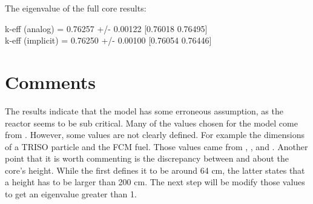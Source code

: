 \documentclass[11pt,letterpaper]{article}
\begin{document}
The eigenvalue of the full core results:

\noindent
k-eff (analog)    = 0.76257 +/- 0.00122  [0.76018  0.76495]\\
\noindent
k-eff (implicit)  = 0.76250 +/- 0.00100  [0.76054  0.76446]

\section{Comments}

The results indicate that the model has some erroneous assumption, as the reactor seems to be sub critical.
Many of the values chosen for the model come from \cite{hawari_development_2018}. However, some values are not clearly defined.
For example the dimensions of a TRISO particle and the FCM fuel. Those values came from \cite{powers_fully_2013}, \cite{jo_preliminary_2014}, and \cite{venneri_neutronic_2015}.
Another point that it is worth commenting is the discrepancy between \cite{hawari_development_2018} and \cite{jo_preliminary_2014} about the core's height. While the first defines it to be around 64 cm, the latter states that a height has to be larger than 200 cm.
The next step will be modify those values to get an eigenvalue greater than 1.

\pagebreak


\end{document}
